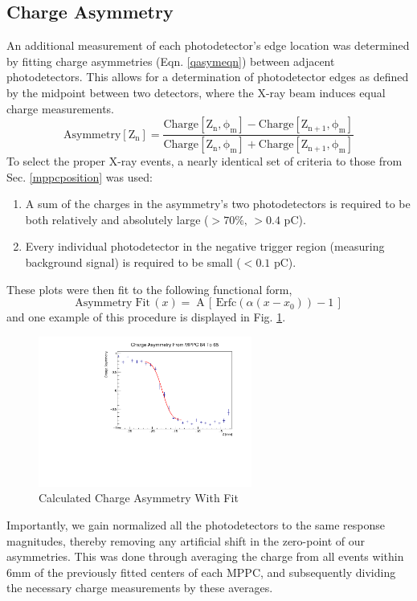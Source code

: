 \subsection{Charge Asymmetry} \label{chargeasym}
\noindent An additional measurement of each photodetector's edge location was determined by fitting charge asymmetries (Eqn. \ref{qasymeqn}) between adjacent photodetectors. 
This allows for a determination of photodetector edges as defined by the midpoint between two detectors, where the X-ray beam induces equal charge measurements.
\begin{equation} \label{qasymeqn}
    \mathrm{Asymmetry[Z_{n}] = \frac{Charge[Z_{n},\phi_{m}]-Charge[Z_{n+1},\phi_{m}]}{Charge[Z_{n},\phi_{m}]+Charge[Z_{n+1},\phi_{m}]}}
\end{equation}
To select the proper X-ray events, a nearly identical set of criteria to those from Sec. \ref{mppcposition} was used:
\begin{enumerate}
    \item A sum of the charges in the asymmetry's two photodetectors is required to be both relatively and absolutely large ($> 70\%,\,>0.4$ pC).
    \item Every individual photodetector in the negative trigger region (measuring background signal) is required to be small ($< 0.1$ pC).
\end{enumerate}
 These plots were then fit to the following functional form,
\begin{equation}
    \mathrm{Asymmetry\; Fit \,}(x)=\;\mathrm{A}\,\left[\,\mathrm{Erfc}\left(\alpha(x-x_{0})\right)-1\,\right]
\end{equation}
and one example of this procedure is displayed in Fig. \ref{fig:asymexample}.
\begin{figure}[H]
\centering
\includegraphics[width=7cm]{graphics/asym6465.pdf}\caption{
Calculated Charge Asymmetry With Fit}
\label{fig:asymexample} 
\end{figure}

Importantly, we gain normalized all the photodetectors to the same response magnitudes, thereby removing any artificial shift in the zero-point of our asymmetries. This was done through averaging the charge from all events within 6mm of the previously fitted centers of each MPPC, and subsequently dividing the necessary charge measurements by these averages.


